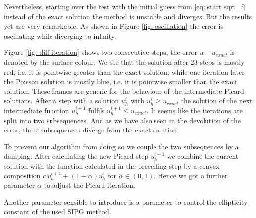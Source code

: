 Nevertheless, starting over the test with the initial guess from \eqref{eq: start sqrt_f} instead of the exact solution the method is unstable and diverges. But the results yet are very remarkable. As shown in Figure \ref{fig: oscillation} the error is oscillating while diverging  to infinity.

Figure \ref{fig: diff iteration} shows two consecutive steps, the error $u-u_{exact}$ is denoted by the surface colour. We see that the solution after 23 steps is mostly red, i.e. it is pointwise greater than the exact solution, while one iteration later the Poisson solution is mostly blue, i.e. it is pointwise smaller than the exact solution. These frames are generic for the behaviour of the intermediate Picard solutions. After a step with a solution $u_h^i$ with $u_h^i \geq u_{exact}$ the solution of the next intermediate function $u^{i+1}_h$ fulfils $u^{i+1}_h \leq u_{exact}$. It seems like the iterations are split into two subsequences. And as we have also seen in the devolution of the error, these subsequences diverge from the exact solution.

To prevent our algorithm from doing so we couple the two subsequences by a damping. After calculating the new Picard step $u^{i+1}_h$ we combine the current solution with the function calculated in the preceding step by a convex composition $ \alpha u_h^{i+1} + (1- \alpha) u_h^i$ for $\alpha \in (0,1)$. Hence we got a further parameter $\alpha$ to adjust the Picard iteration.

Another parameter sensible to introduce is a parameter to control the ellipticity constant of the used SIPG method.
